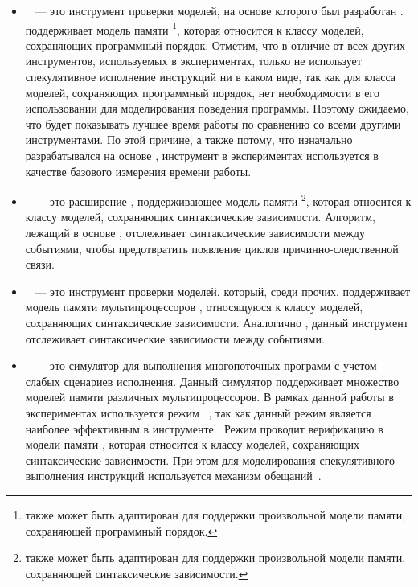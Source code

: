 \begin{itemize}

  \item \genmc~\cite{Kokologiannakis:PLDI2019,Kokologiannakis:CAD2021} ---
    это инструмент проверки моделей, на основе которого был разработан \wmc. 
    \genmc поддерживает модель памяти \RCMM%
    \footnote{\genmc также может быть адаптирован для поддержки 
    произвольной модели памяти, сохраняющей программный порядок.}, 
    которая относится к классу моделей, сохраняющих программный порядок.  
    Отметим, что в отличие от всех других инструментов, используемых в экспериментах, 
    только \genmc не использует спекулятивное исполнение инструкций 
    ни в каком виде, так как для класса моделей, сохраняющих программный порядок,
    нет необходимости в его использовании для моделирования поведения программы. 
    Поэтому ожидаемо, что \genmc будет показывать 
    лучшее время работы по сравнению со всеми другими инструментами. 
    По этой причине, а также потому, что \wmc изначально разрабатывался 
    на основе \genmc, инструмент \genmc в экспериментах 
    используется в качестве базового измерения времени работы. 

  \item \hmc~\cite{Kokologiannakis-Vafeiadis:ASPLOS2020} --- 
    это расширение \genmc, поддерживающее модель памяти \IMM
    \footnote{\hmc также может быть адаптирован для поддержки 
    произвольной модели памяти, сохраняющей синтаксические зависимости.},
    которая относится к классу моделей, сохраняющих синтаксические зависимости.  
    Алгоритм, лежащий в основе \hmc, отслеживает синтаксические зависимости между событиями, 
    чтобы предотвратить появление циклов причинно-следственной связи. 

  \item \Nidhugg~\cite{Abdulla-al:TACAS2015,Abdulla-al:CAV2016} --- 
    это инструмент проверки моделей, который, среди прочих, 
    поддерживает модель памяти мультипроцессоров \POWER, 
    относящуюся к классу моделей, сохраняющих синтаксические зависимости.  
    Аналогично \hmc, данный инструмент отслеживает синтаксические зависимости между событиями.

  \item \rmem~\cite{RMEM} --- 
    это симулятор для выполнения многопоточных программ с учетом слабых сценариев исполнения. 
    Данный симулятор поддерживает множество моделей памяти различных мультипроцессоров. 
    В рамках данной работы в экспериментах используется режим \PrmARM%
    ~\cite{Pulte-al:PLDI2019}, так как данный режим является 
    наиболее эффективным в инструменте \rmem.
    Режим \PrmARM проводит верификацию в модели памяти , 
    которая относится к классу моделей, сохраняющих синтаксические зависимости. 
    При этом для моделирования спекулятивного выполнения инструкций 
    используется механизм обещаний~\cite{Kang-al:POPL17}.  


\end{itemize}
